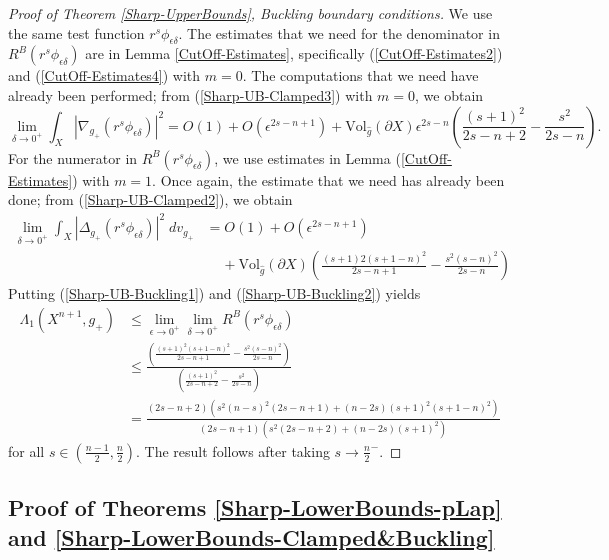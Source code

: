 \documentclass{amsart}
\newcommand{\Vol}{\text{Vol}}
\newcommand{\D}{\delta}
\newcommand{\E}{\epsilon}
\begin{document}
\begin{proof}[Proof of Theorem \ref{Sharp-UpperBounds}, Buckling boundary conditions]
 We use the same test function $r^{s}\phi_{\E\D}$. The estimates that we need for the denominator in $R^B(r^s\phi_{\E\D})$ are in Lemma \ref{CutOff-Estimates}, specifically (\ref{CutOff-Estimates2}) and (\ref{CutOff-Estimates4}) with $m=0$. The computations that we need have already been performed; from (\ref{Sharp-UB-Clamped3}) with $m=0$, we obtain 
 \begin{equation}\label{Sharp-UB-Buckling1}
     \lim_{\D\to0^+}\int_X|\nabla_{g_+}(r^s\phi_{\E\D})|^2 = O(1)+O(\E^{2s-n+1}) + \Vol_{\hat g}(\partial X)\E^{2s-n}\left(\frac{(s+1)^2}{2s-n+2} - \frac{s^2}{2s-n}\right).
 \end{equation}
 For the numerator in $R^B(r^s\phi_{\E\D})$, we use estimates in Lemma (\ref{CutOff-Estimates}) with $m=1$. Once again, the estimate that we need has already been done; from (\ref{Sharp-UB-Clamped2}), we obtain
 \begin{equation}\label{Sharp-UB-Buckling2}
 \begin{split}
     \lim_{\D\to0^+}\int_X |\Delta_{g_+}(r^s\phi_{\E\D})|^2\;dv_{g_+} &=  O(1) + O(\E^{2s-n+1}) \\&\;\;\;\;+ \Vol_{\hat g}(\partial X)\left(\frac{(s+1)2(s+1-n)^2}{2s-n+1} - \frac{s^2(s-n)^2}{2s-n}\right)
 \end{split}
 \end{equation}
Putting (\ref{Sharp-UB-Buckling1}) and (\ref{Sharp-UB-Buckling2}) yields
\[
\begin{split}
\Lambda_1(X^{n+1},g_+) &\le \lim_{\E\to 0^+}\lim_{\D\to0^+}R^B(r^s\phi_{\E\D}) \\&\le \frac{\displaystyle\left(\frac{(s+1)^2(s+1-n)^2}{2s-n+1} - \frac{s^2(s-n)^2}{2s-n}\right)}{\displaystyle\left(\frac{(s+1)^2}{2s-n+2} - \frac{s^2}{2s-n}\right)} \\&= 
\frac{(2s - n + 2)\left(s^2 (n - s)^2 (2s - n + 1) + (n - 2s)(s+1)^2 (s+1 - n)^2\right)}{(2s - n + 1)\left(s^2 (2s - n + 2) + (n - 2s)(s+1)^2\right)}
\end{split}
\]
for all $s\in(\frac{n-1}{2}, \frac{n}{2})$. The result follows after taking $s\to \frac{n}{2}^-$.
\end{proof}

\subsection{Proof of Theorems \ref{Sharp-LowerBounds-pLap} and \ref{Sharp-LowerBounds-Clamped&Buckling}}
\end{document}
